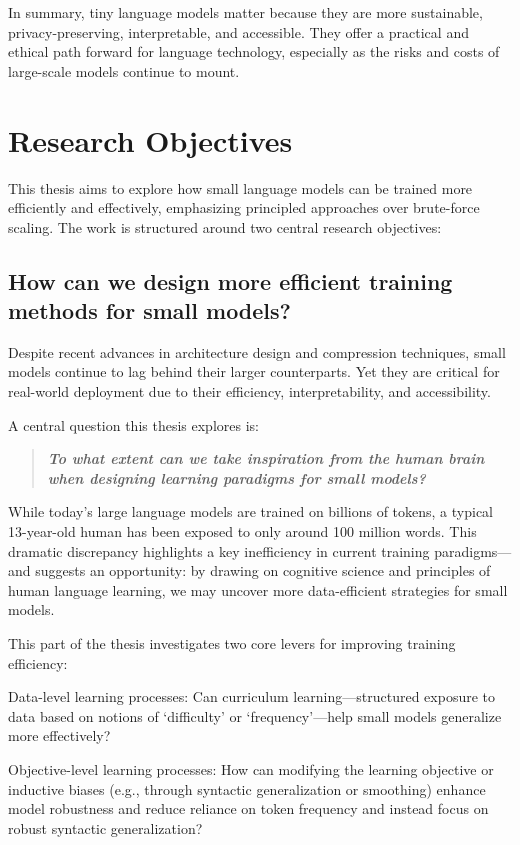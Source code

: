 In summary, tiny language models matter because they are more sustainable, privacy-preserving, interpretable, and accessible. They offer a practical and ethical path forward for language technology, especially as the risks and costs of large-scale models continue to mount.

\section*{Research Objectives}

This thesis aims to explore how small language models can be trained more efficiently and effectively, emphasizing principled approaches over brute-force scaling. The work is structured around two central research objectives:

\subsection{How can we design more efficient training methods for small models?}

Despite recent advances in architecture design and compression techniques, small models continue to lag behind their larger counterparts. Yet they are critical for real-world deployment due to their efficiency, interpretability, and accessibility.

A central question this thesis explores is:

\begin{quote}
    \textbf{\emph{To what extent can we take inspiration from the human brain when designing learning paradigms for small models?}}
\end{quote}

While today's large language models are trained on billions of tokens, a typical 13-year-old human has been exposed to only around 100 million words. This dramatic discrepancy highlights a key inefficiency in current training paradigms—and suggests an opportunity: by drawing on cognitive science and principles of human language learning, we may uncover more data-efficient strategies for small models.

This part of the thesis investigates two core levers for improving training efficiency:

Data-level learning processes: Can curriculum learning—structured exposure to data based on notions of `difficulty' or `frequency'—help small models generalize more effectively?

Objective-level learning processes: How can modifying the learning objective or inductive biases (e.g., through syntactic generalization or smoothing) enhance model robustness and reduce reliance on token frequency and instead focus on robust syntactic generalization?

